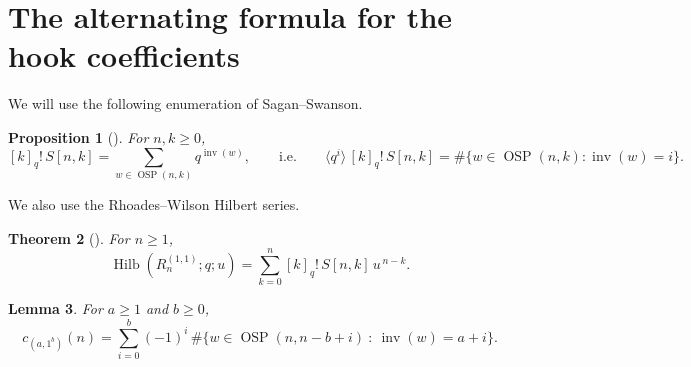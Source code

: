 \documentclass[11pt]{amsart}
\newtheorem{theorem}{Theorem}
\newtheorem{proposition}[theorem]{Proposition}
\newtheorem{lemma}[theorem]{Lemma}
\theoremstyle{definition}
\DeclareMathOperator{\Hilb}{Hilb}
\DeclareMathOperator{\OSP}{OSP}
\DeclareMathOperator{\inv}{inv}
\begin{document}
\section{The alternating formula for the hook coefficients}\label{sec:alternating}

We will use the following enumeration of Sagan--Swanson.

\begin{proposition}[\!]\label{prop:OSP-inv}
For $n,k\ge0$,
\begin{equation}\label{eq:OSP-equation}
[k]_q!\,S[n,k] = \sum_{w \in \OSP(n,k)}q^{\inv(w)},
\qquad\text{i.e.}\qquad
\langle q^i\rangle\,[k]_q!\,S[n,k]=\#\{w\in\OSP(n,k):\inv(w)=i\}.
\end{equation}
\end{proposition}

We also use the Rhoades--Wilson Hilbert series.

\begin{theorem}[\!\!\cite{RhoadesWilson2023}]\label{thm:hilbert}
For $n\ge1$,
\begin{equation}\label{eq:hilbert-rhoades-wilson}
\Hilb(R_n^{(1,1)};q;u) = \sum_{k=0}^n [k]_q!\,S[n,k]\,u^{\,n-k}.
\end{equation}
\end{theorem}

\begin{lemma}\label{lem:c_{(a,1^b)}}
For $a\ge1$ and $b\ge0$,
\begin{equation}\label{eq:first-formula-coeffs}
c_{(a,1^b)}(n) =
\sum_{i=0}^b (-1)^i\,\#\{w \in \OSP(n,n-b+i)\ :\ \inv(w) = a+i \}.
\end{equation}
\end{lemma}
\end{document}
